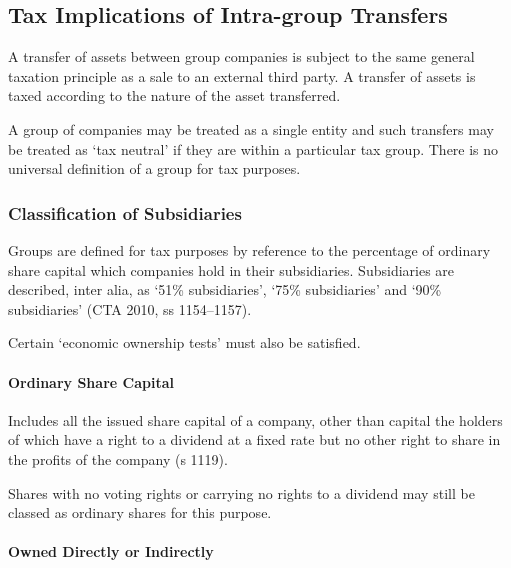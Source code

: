 \documentclass[
]{article}
\begin{document}
\hypertarget{tax-implications-of-intra-group-transfers}{%
\subsection{Tax Implications of Intra-group
Transfers}\label{tax-implications-of-intra-group-transfers}}

A transfer of assets between group companies is subject to the same
general taxation principle as a sale to an external third party. A
transfer of assets is taxed according to the nature of the asset
transferred.

A group of companies may be treated as a single entity and such
transfers may be treated as `tax neutral' if they are within a
particular tax group. There is no universal definition of a group for
tax purposes.

\hypertarget{classification-of-subsidiaries}{%
\subsubsection{Classification of
Subsidiaries}\label{classification-of-subsidiaries}}

Groups are defined for tax purposes by reference to the percentage of
ordinary share capital which companies hold in their subsidiaries.
Subsidiaries are described, inter alia, as `51\% subsidiaries', `75\%
subsidiaries' and `90\% subsidiaries' (CTA 2010, ss 1154--1157).

Certain `economic ownership tests' must also be satisfied.

\hypertarget{ordinary-share-capital}{%
\paragraph{Ordinary Share Capital}\label{ordinary-share-capital}}

Includes all the issued share capital of a company, other than capital
the holders of which have a right to a dividend at a fixed rate but no
other right to share in the profits of the company (s 1119).

Shares with no voting rights or carrying no rights to a dividend may
still be classed as ordinary shares for this purpose.

\hypertarget{owned-directly-or-indirectly}{%
\paragraph{Owned Directly or
Indirectly}\label{owned-directly-or-indirectly}}
\end{document}
